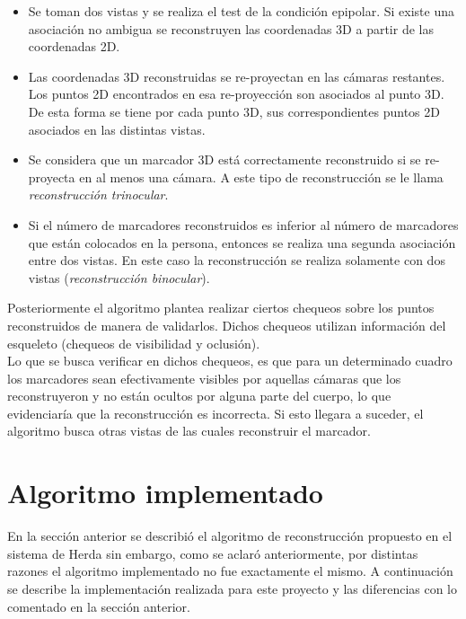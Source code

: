 \begin{itemize}
\item Se toman dos vistas y se realiza el test de la condición epipolar. Si existe una asociación no ambigua se reconstruyen  las coordenadas 3D a partir de las coordenadas 2D.

\item Las coordenadas 3D reconstruidas se re-proyectan en las cámaras restantes. Los puntos 2D encontrados en esa re-proyección son asociados al punto 3D. De esta forma se tiene por cada punto 3D, sus correspondientes puntos 2D asociados en las distintas vistas.\

\item Se considera que un marcador 3D está correctamente reconstruido si se re-proyecta en al menos una cámara. A este tipo de reconstrucción se le llama \textit{reconstrucción trinocular}.\\

\item Si el número de marcadores reconstruidos es inferior al número de marcadores que están colocados en la persona, entonces se realiza una segunda asociación entre dos vistas. En este caso la reconstrucción se realiza solamente con dos vistas (\textit{reconstrucción binocular}).\\

\end{itemize}

Posteriormente el algoritmo plantea realizar ciertos chequeos sobre los puntos reconstruidos de manera de validarlos. Dichos chequeos utilizan información del esqueleto (chequeos de visibilidad y oclusión).\\

Lo que se busca verificar en dichos chequeos, es que para un determinado cuadro los marcadores sean efectivamente visibles por aquellas cámaras que los reconstruyeron y no están ocultos por alguna parte del cuerpo, lo que evidenciaría que la reconstrucción es incorrecta. Si esto llegara a suceder, el algoritmo busca otras vistas de las cuales reconstruir el marcador.\\

\section{Algoritmo implementado}

En la sección anterior se describió el algoritmo de reconstrucción propuesto en el sistema de Herda sin embargo, como se aclaró anteriormente, por distintas razones el algoritmo implementado no fue exactamente el mismo. A continuación se describe la implementación realizada para este proyecto y las diferencias con lo comentado en la sección anterior.

